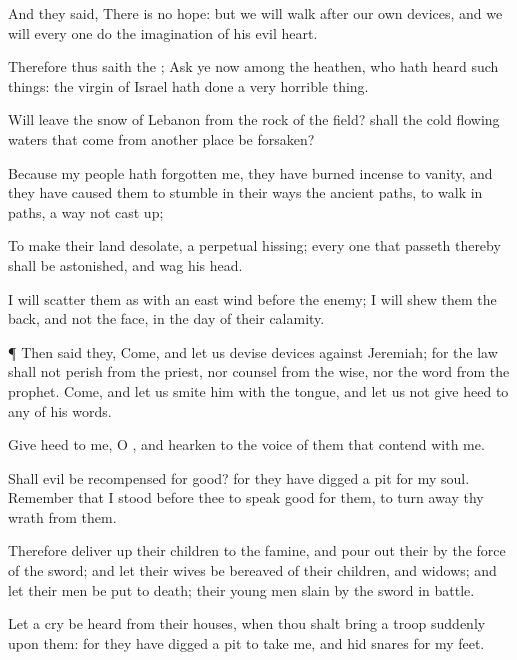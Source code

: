 {And they
said, There is no
hope: but we will
walk
after our own
devices, and we will every
one
do the
imagination of his
evil
heart.

Therefore thus
saith the
{};
Ask ye now among the
heathen, who hath
heard such things: the
virgin of
Israel hath
done a
very horrible
thing.

Will
{}
leave the
snow of
Lebanon
{} from the
rock of the
field?
{} shall the
cold
flowing
waters that come from another
place be
forsaken?

Because my
people hath
forgotten me, they have burned
incense to
vanity, and they have caused them to
stumble in their
ways
{} the
ancient
paths, to
walk in
paths,
{} a
way not cast
up;

To
make their
land
desolate,
{} a
perpetual
hissing; every one that
passeth thereby shall be
astonished, and
wag his
head.

I will
scatter them as with an
east
wind
before the
enemy; I will
shew them the
back, and not the
face, in the
day of their
calamity.


\par }{\PP {}¶ Then
said they,
Come, and let us
devise
devices against
Jeremiah; for the
law shall not
perish from the
priest, nor
counsel from the
wise, nor the
word from the
prophet.
Come, and let us
smite him with the
tongue, and let us not give
heed to any of his
words.

Give
heed to me, O
{}, and
hearken to the
voice of them that
contend with me.

Shall
evil be
recompensed for
good? for they have
digged a
pit for my
soul.
Remember that I
stood
before thee to
speak
good for them,
{} to turn
away thy
wrath from them.

Therefore deliver
up their
children to the
famine, and pour
out their
{} by the
force of the
sword; and let their
wives be
bereaved of their children, and
{}
widows; and let their
men be
put to
death;
{} their young
men
{}
slain by the
sword in
battle.

Let a
cry be
heard from their
houses, when thou shalt
bring a
troop
suddenly upon them: for they have
digged a
pit to
take me, and
hid
snares for my
feet.

}
